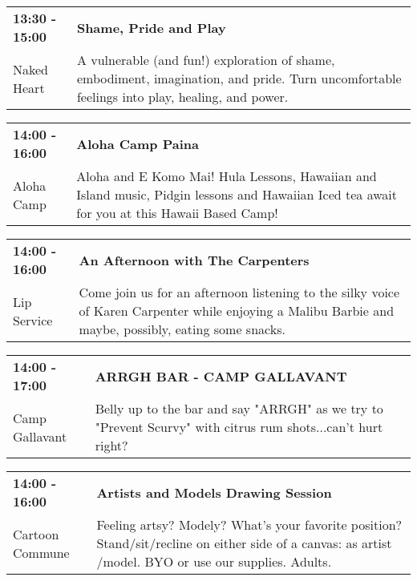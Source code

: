 \begin{tabular}{ p{1in} p{2.2in} }
    \textbf{13:30 - 15:00} & \textbf{Shame, Pride and Play} \\
    Naked Heart \newline  & A vulnerable (and fun!) exploration of shame, embodiment, imagination, and pride. Turn uncomfortable feelings into play, healing, and power. \\
    \hline 
\end{tabular}
    
\begin{tabular}{ p{1in} p{2.2in} }
    \textbf{14:00 - 16:00} & \textbf{Aloha Camp Paina} \\
    Aloha Camp \newline  & Aloha and E Komo Mai!  Hula Lessons, Hawaiian and Island music, Pidgin lessons and Hawaiian Iced tea await for you at this Hawaii Based Camp! \\
    \hline 
\end{tabular}
    
\begin{tabular}{ p{1in} p{2.2in} }
    \textbf{14:00 - 16:00} & \textbf{An Afternoon with The Carpenters} \\
    Lip Service \newline  & Come join us for an afternoon listening to the silky voice of Karen Carpenter while enjoying a Malibu Barbie and maybe, possibly, eating some snacks. \\
    \hline 
\end{tabular}
    
\begin{tabular}{ p{1in} p{2.2in} }
    \textbf{14:00 - 17:00} & \textbf{ARRGH BAR - CAMP GALLAVANT} \\
    Camp Gallavant \newline  & Belly up to the bar and say "ARRGH"  as we try to "Prevent Scurvy" with citrus rum shots...can't hurt right? \\
    \hline 
\end{tabular}
    
\begin{tabular}{ p{1in} p{2.2in} }
    \textbf{14:00 - 16:00} & \textbf{Artists and Models Drawing Session} \\
    Cartoon Commune \newline  & Feeling artsy? Modely? What's your favorite position? Stand/sit/recline on either side of a canvas: as artist /model. BYO or use our supplies. Adults. \\
    \hline 
\end{tabular}
    
